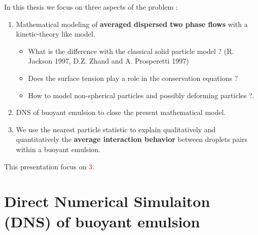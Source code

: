\documentclass{sintefbeamer}
\begin{document}
\begin{frame}
  {In this thesis we focus on three aspects of the problem :}
  \Large
  \begin{enumerate}
    \item Mathematical modeling of \textbf{averaged dispersed two phase flows} with a kinetic-theory like model. 
    \begin{itemize}
      \item What is the difference with the classical solid particle model ? (R. Jackson 1997, D.Z. Zhand and A. Prosperetti 1997)
      \item Does the surface tension play a role in the conservation equations ? 
      \item How to model non-spherical particles and possibly deforming particles ?. 
    \end{itemize}  
    \item DNS of buoyant emulsion to close the present mathematical model. 
    \item We use the nearest particle statistic to explain qualitatively and quantitatively the \textbf{average interaction behavior} between droplets pairs within a buoyant emulsion. 
  \end{enumerate}
  This presentation focus on \textcolor{red}{3.}
\end{frame}


\section{Direct Numerical Simulaiton (DNS) of buoyant emulsion}
\section*{}
\end{document}
